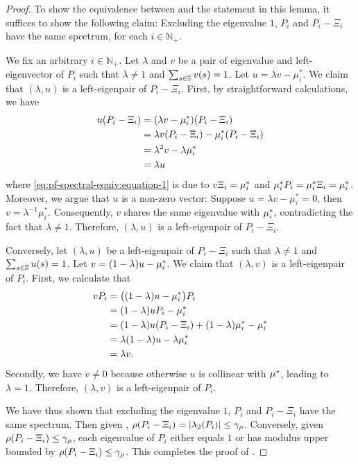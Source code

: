 \begin{proof}
    To show the equivalence between  and the statement in this lemma, it suffices to show the following claim: 
    Excluding the eigenvalue $1$, $P_i$ and $P_i - \Xi_i$ have the same spectrum, for each $i\in \mathbb{N}_+$.  

    We fix an arbitrary $i\in \mathbb{N}_+$. 
    Let $\lambda$ and $v$ be a pair of eigenvalue and left-eigenvector of $P_i$ such that $\lambda \neq 1$ and $\sum_{s\in\mathbb{S}} v(s) = 1$. Let $u = \lambda v - \mu^*_i$. 
    We claim that $(\lambda, u)$ is a left-eigenpair of $P_i - \Xi_i$. First, by straightforward calculations, we have
    \begin{align}
        \nonumber
        u (P_i - \Xi_i)
        &= (\lambda v - \mu^*_i) (P_i - \Xi_i)\\
        \nonumber
        &= \lambda v (P_i - \Xi_i) - \mu^*_i (P_i - \Xi_i) \\
        \label{eq:pf-spectral-equiv:equation-1}
        &= \lambda^2 v - \lambda \mu^*_i \\
        \nonumber
        &= \lambda u
    \end{align}
    where \eqref{eq:pf-spectral-equiv:equation-1} is due to $v\Xi_i = \mu^*_i$ and $\mu^*_i P_i = \mu^*_i \Xi_i = \mu^*_i$. 
    Moreover, we argue that $u$ is a non-zero vector: Suppose $u =\lambda v - \mu^*_i = 0$, then $v = \lambda^{-1} \mu^*_i$. Consequently, $v$ shares the same eigenvalue with $\mu^*_i$, contradicting the fact that $\lambda \neq 1$. 
    Therefore, $(\lambda, u)$ is a left-eigenpair of $P_i - \Xi_i$. 

    Conversely, let $(\lambda, u)$ be a left-eigenpair of $P_i - \Xi_i$ such that $\lambda \neq 1$ and $\sum_{s\in\mathbb{S}}u(s) = 1$. Let $v = (1-\lambda) u - \mu^*_i$. We claim that $(\lambda, v)$ is a left-eigenpair of $P_i$. First, we calculate that 
    \begin{align*}
        \nonumber
        v P_i
        &=  \big((1-\lambda) u - \mu^*_i\big) P_i \\
        &= (1-\lambda)u P_i - \mu^*_i \\
        &= (1-\lambda)u (P_i - \Xi_i) + (1-\lambda)\mu^*_i - \mu^*_i \\
        &= \lambda(1-\lambda)u -\lambda \mu^*_i \\
        &= \lambda v.
    \end{align*}
    Secondly, we have $v\neq 0$ because otherwise $u$ is collinear with $\mu^*$, leading to $\lambda = 1$. 
    Therefore, $(\lambda, v)$ is a left-eigenpair of $P_i$. 

    We have thus shown that excluding the eigenvalue $1$, $P_i$ and $P_i - \Xi_i$ have the same spectrum. 
    Then given , $\rho(P_i - \Xi_i) = \left\lvert\lambda_2(P_i)\right\rvert \leq \gamma_{\rho}$. Conversely, given $\rho(P_i - \Xi_i) \leq \gamma_{\rho}$, each eigenvalue of $P_i$ either equals $1$ or has modulus upper bounded by $\rho(P_i - \Xi_i) \leq \gamma_{\rho}$. This completes the proof of . 
\end{proof}

